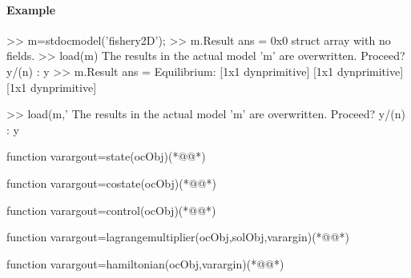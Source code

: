 \paragraph{Example}
\begin{matlab}
>> m=stdocmodel('fishery2D');
>> m.Result
ans = 
0x0 struct array with no fields.
>> load(m)
The results in the actual model 'm' are overwritten. Proceed? y/(n) : y
>> m.Result
ans = 
    Equilibrium: {[1x1 dynprimitive]  [1x1 dynprimitive]  [1x1 dynprimitive]}
		
>> load(m,'%
The results in the actual model 'm' are overwritten. Proceed? y/(n) : y		
\end{matlab}
\begin{matlab}
function varargout=state(ocObj)(*@@*)
%
% 
\end{matlab}
\begin{matlab}
function varargout=costate(ocObj)(*@@*)
%
% 
\end{matlab}
\begin{matlab}
function varargout=control(ocObj)(*@@*)
%
% 
\end{matlab}
\begin{matlab}
function varargout=lagrangemultiplier(ocObj,solObj,varargin)(*@@*)
%
%
% 
\end{matlab}
\begin{matlab}
function varargout=hamiltonian(ocObj,varargin)(*@@*)
%
% 
% 
\end{matlab}
